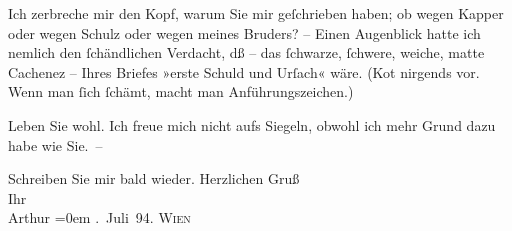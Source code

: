 \pstart
           Ich zerbreche mir den Kopf, warum Sie mir geſchrieben haben; ob wegen Kapper oder wegen Schulz oder wegen meines Bruders? – Einen Augenblick hatte ich nemlich den
               ſchändlichen Ver{\pb}dacht, dß – das ſchwarze, ſchwere,
               weiche, matte Cachenez – Ihres Briefes »erste Schuld und Urſach« wäre. (Ko{\geminationm}t nirgends vor. Wenn man ſich ſchämt, macht man
               Anführungszeichen.)\pend
           
\pstart
           Leben Sie wohl. Ich freue {\pb}mich nicht aufs Siegeln,
               obwohl ich mehr Grund dazu habe wie Sie. –\pend
           
\pstart
           Schreiben Sie mir bald wieder. Herzlichen Gruß{\\[\baselineskip]}Ihr{\\[\baselineskip]}\spacefill\mbox{Arthur}\pend
           \leftskip=0em{}
. Juli 94. \textsc{Wien}\pend
           \endnumbering{}  
      